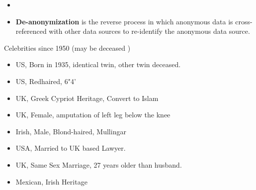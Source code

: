 \documentclass{beamer}
\begin{document}
\begin{frame}
	\begin{itemize}
		\item 
		\item \textbf{De-anonymization} is the reverse process in which anonymous data is cross-referenced with other data sources to re-identify the anonymous data source.
	\end{itemize}
\end{frame}
\begin{frame}
	Celebrities since 1950 (may be deceased )
	\begin{itemize}
		\item US, Born in 1935,  identical twin, other twin deceased.
		\item US, Redhaired, 6"4'
		\item UK, Greek Cypriot Heritage, Convert to Islam
		\item UK, Female, amputation of left leg below the knee
		\item Irish, Male, Blond-haired, Mullingar
		\item USA, Married to UK based Lawyer.
		\item UK, Same Sex Marriage, 27 years older than husband.
		\item Mexican, Irish Heritage
	\end{itemize}
	
\end{frame}
\end{document}
